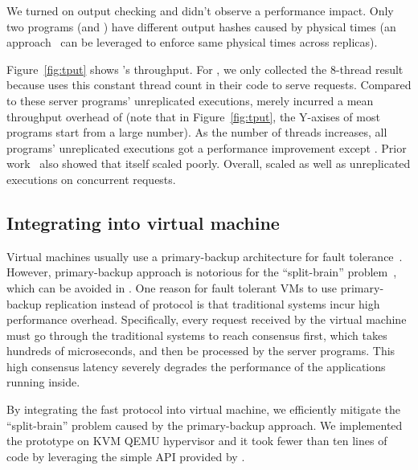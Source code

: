 We turned on output checking and didn't 
observe a performance impact. Only two programs (\mysql and \openldap) 
have different output hashes caused by physical times 
(an approach~\cite{paxos:practical} can be leveraged to enforce same physical 
times across replicas).

Figure~\ref{fig:tput} shows \xxx's throughput. For \calvin, we only collected 
the 8-thread result because \calvin uses this constant thread count in their 
code to serve requests. Compared to these server programs' 
unreplicated executions, \xxx merely incurred a mean throughput overhead of 
\tputoverhead (note that in Figure~\ref{fig:tput}, the Y-axises of most 
programs start from a large number). As the number of threads increases, all 
programs' unreplicated executions got a performance improvement except 
\memcached. Prior work~\cite{rex:eurosys14} also showed that
\memcached itself scaled poorly. Overall, \xxx scaled as well as unreplicated 
executions on concurrent requests.

\subsection{Integrating \xxx into virtual machine} \label{sec:overhead}
Virtual machines usually use a primary-backup architecture for fault 
tolerance~\cite{alsberg1976principle}. However, primary-backup approach is 
notorious for the ``split-brain'' problem~\cite{scales2010design}, which can be 
avoided in \paxos. One reason for fault tolerant VMs to use 
primary-backup replication instead of \paxos protocol is that traditional \paxos 
systems incur high performance overhead. Specifically, every 
request received by the virtual machine must go through the traditional \paxos 
systems to reach consensus first, which takes hundreds of microseconds, and then 
be processed by the server programs. This high consensus latency severely 
degrades the performance of the applications running inside.

By integrating the fast \xxx \paxos protocol into virtual machine, we 
efficiently mitigate the ``split-brain'' problem caused by the primary-backup 
approach. We implemented the prototype on KVM QEMU hypervisor and it took fewer 
than ten lines of code by leveraging the simple API provided by \xxx.
